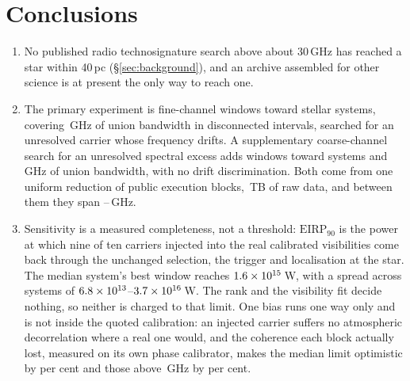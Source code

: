 \section{Conclusions}
\label{sec:conclusions}

\begin{enumerate}[leftmargin=1.6em,itemsep=4pt,topsep=4pt,parsep=0pt]

\item No published radio technosignature search above about 30\,GHz has
reached a star within 40\,pc (\S\ref{sec:background}), and an archive
assembled for other science is at present the only way to reach one.

\item The primary experiment is \NWinA{} fine-channel windows toward
\NSysClassA{} stellar systems, covering \CvUnionA\,GHz of union bandwidth in
disconnected intervals, searched for an unresolved carrier whose frequency
drifts. A supplementary coarse-channel search for an unresolved spectral
excess adds \NWinB{} windows toward \PrSysClassB{} systems and
\CvUnionB\,GHz of union bandwidth, with no drift discrimination. Both come
from one uniform reduction of \NEB{} public execution blocks,
\TotalDataTB\,TB of raw data, and between them they span
\SurvFreqLo--\SurvFreqHi\,GHz.

\item Sensitivity is a measured completeness, not a threshold:
$\mathrm{EIRP}_{90}$ is the power at which nine of ten carriers injected into
the real calibrated visibilities come back through the unchanged selection,
the trigger and localisation at the star. The median
system's best window reaches $1.6\times10^{15}$\,W, with a spread across
systems of $6.8\times10^{13}$--$3.7\times10^{16}$\,W. The rank and the
visibility fit decide nothing, so neither is charged to that limit. One bias
runs one way only and is not inside the quoted calibration: an injected
carrier suffers no atmospheric decorrelation where a real one would, and the
coherence each block actually lost, measured on its own phase calibrator,
makes the median limit optimistic by \SensDecorPct{} per cent and those above
\SensDecorHiGHz{}\,GHz by \SensDecorHiPct{} per cent.


\end{enumerate}
